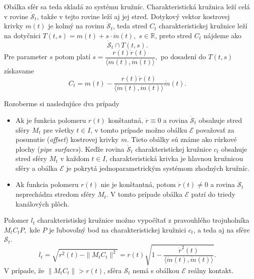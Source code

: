 Obálka sfér sa teda skladá zo systému kružníc. Charakteristická kružnica leží celá v rovine $\mathcal{\dot{S}}_t $, takže v tejto rovine leží aj jej stred. Dotykový vektor kostrovej krivky $m(t)$ je kolmý na rovinu $\mathcal{\dot{S}}_t$, teda stred $C_t$ charakteristickej kružnice leží na dotyčnici $T(t, s)= m(t) + s \cdot \dot{m}(t),$ $s \in \mathbb{R}$, preto stred $C_t$ nájdeme ako
$$ \mathcal{\dot{S}}_t \cap T(t, s).$$
Pre parameter $s$ potom platí $s = \dfrac{r(t) \dot{r}(t)}{\langle \dot{m}(t), \dot{m}(t) \rangle }, $
po dosadení do $T(t, s)$ získavame
\begin{equation}
\label{eq:stred charakteristickej kruznice}
C_t = m(t) - \frac{r(t) \dot{r}(t)}{\langle \dot{m}(t), \dot{m}(t) \rangle} \dot{m}(t).
\end{equation}

Rozoberme si nasledujúce dva prípady
\begin{itemize}
\item Ak je funkcia polomeru $r(t)$ konštantná, $\dot{r} \equiv 0$ a rovina $\mathcal{\dot{S}}_t$ obsahuje stred sféry $M_t$ pre všetky $t \in I$, v tomto prípade možno obálku $\mathcal{E}$ považovať za posunutie (\textit{offset}) kostrovej krivky $m$. Tieto obálky sú známe ako rúrkové plochy (\textit{pipe surfaces}). Keďže rovina $\mathcal{\dot{S}}_t$ charakteristickej kružnice $c_t$ obsahuje stred sféry $M_t$ v každom $t \in I$, charakteristická krivka je hlavnou kružnicou sféry a obálka $\mathcal{E}$ je pokrytá jednoparametrickým systémom zhodných kružníc.
\item Ak funkcia polomeru $r(t)$ nie je konštantná, potom $\dot{r}(t) \neq 0$ a rovina $\mathcal{\dot{S}}_t$  neprechádza stredom sféry $M_t$. V tomto prípade obálka $\mathcal{E}$ patrí do triedy kanálových plôch.
\end{itemize}

Polomer $l_t$ charakteristiskej kružnice  možno vypočítať z pravouhlého trojuholníka $M_tC_tP,$ kde $P$ je ľubovoľný bod na charakteristickej kružnici $c_t$, a teda aj na sfére $\mathcal{S}_t.$
$$ l_t = \sqrt{r^2(t) - \|M_tC_t\|^2} = r(t) \sqrt{ 1 - \frac{\dot{r}^2(t)}{\langle \dot{m}(t), \dot{m}(t) \rangle}}. $$
V prípade, že $ \|M_tC_t\| > r(t)$, sféra $\mathcal{S}_t$ nemá s obálkou $\mathcal{E}$ reálny kontakt. 

